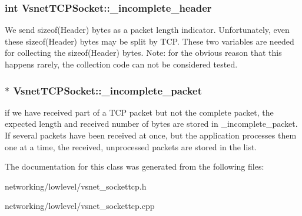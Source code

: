 \subsubsection[{\texorpdfstring{\+\_\+incomplete\+\_\+header}{_incomplete_header}}]{\setlength{\rightskip}{0pt plus 5cm}int Vsnet\+T\+C\+P\+Socket\+::\+\_\+incomplete\+\_\+header\hspace{0.3cm}{\ttfamily [protected]}}\hypertarget{classVsnetTCPSocket_a698fa2d1de57dac543513891b3dfe034}{}\label{classVsnetTCPSocket_a698fa2d1de57dac543513891b3dfe034}
We send sizeof(\+Header) bytes as a packet length indicator. Unfortunately, even these sizeof(\+Header) bytes may be split by T\+CP. These two variables are needed for collecting the sizeof(\+Header) bytes. Note\+: for the obvious reason that this happens rarely, the collection code can not be considered tested. 
\subsubsection[{\texorpdfstring{\+\_\+incomplete\+\_\+packet}{_incomplete_packet}}]{$\ast$ Vsnet\+T\+C\+P\+Socket\+::\+\_\+incomplete\+\_\+packet\hspace{0.3cm}{\ttfamily [protected]}}\hypertarget{classVsnetTCPSocket_a977f743b1588c500ed5cd84a9914e485}{}\label{classVsnetTCPSocket_a977f743b1588c500ed5cd84a9914e485}
if we have received part of a T\+CP packet but not the complete packet, the expected length and received number of bytes are stored in \+\_\+incomplete\+\_\+packet. If several packets have been received at once, but the application processes them one at a time, the received, unprocessed packets are stored in the list. 

The documentation for this class was generated from the following files\+:\begin{DoxyCompactItemize}
\item 
networking/lowlevel/vsnet\+\_\+sockettcp.\+h\item 
networking/lowlevel/vsnet\+\_\+sockettcp.\+cpp\end{DoxyCompactItemize}
